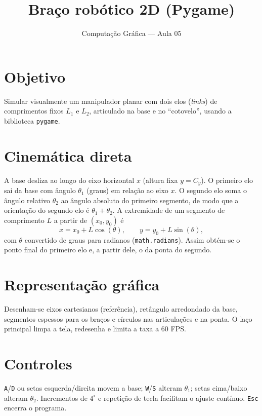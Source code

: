 \documentclass[11pt,a4paper]{article}
\title{Braço robótico 2D (Pygame)}
\author{Computação Gráfica --- Aula 05}
\date{}
\begin{document}
\maketitle
\vspace{-1.2em}

\section*{Objetivo}
Simular visualmente um manipulador planar com dois elos (\emph{links}) de comprimentos fixos $L_1$ e $L_2$, articulado na base e no ``cotovelo'', usando a biblioteca \texttt{pygame}.

\section*{Cinemática direta}
A base desliza ao longo do eixo horizontal $x$ (altura fixa $y = C_y$). O primeiro elo sai da base com ângulo $\theta_1$ (graus) em relação ao eixo $x$. O segundo elo soma o ângulo relativo $\theta_2$ ao ângulo absoluto do primeiro segmento, de modo que a orientação do segundo elo é $\theta_1 + \theta_2$. A extremidade de um segmento de comprimento $L$ a partir de $(x_0,y_0)$ é
\begin{equation*}
  x = x_0 + L\cos(\theta),\qquad y = y_0 + L\sin(\theta),
\end{equation*}
com $\theta$ convertido de graus para radianos (\texttt{math.radians}). Assim obtém-se o ponto final do primeiro elo e, a partir dele, o da ponta do segundo.

\section*{Representação gráfica}
Desenham-se eixos cartesianos (referência), retângulo arredondado da base, segmentos espessos para os braços e círculos nas articulações e na ponta. O laço principal limpa a tela, redesenha e limita a taxa a 60 FPS.

\section*{Controles}
\texttt{A}/\texttt{D} ou setas esquerda/direita movem a base; \texttt{W}/\texttt{S} alteram $\theta_1$; setas cima/baixo alteram $\theta_2$. Incrementos de $4^\circ$ e repetição de tecla facilitam o ajuste contínuo. \texttt{Esc} encerra o programa.
\end{document}
